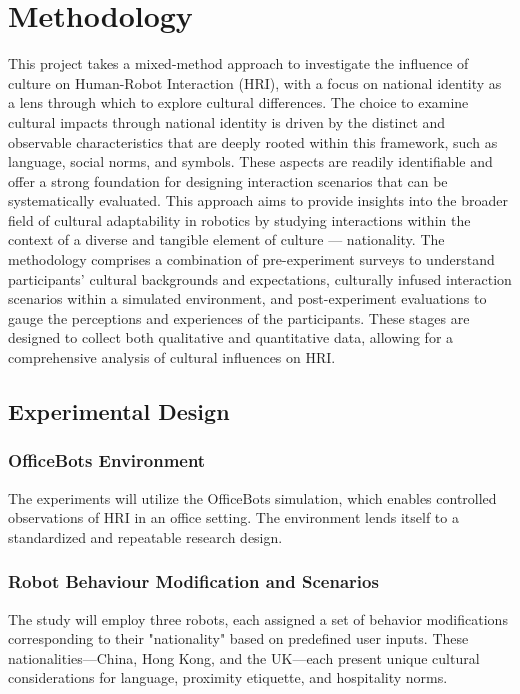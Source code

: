 \chapter{Methodology}

This project takes a mixed-method approach to investigate the influence of culture on Human-Robot Interaction (HRI), with a focus on national identity as a lens through which to explore cultural differences. The choice to examine cultural impacts through national identity is driven by the distinct and observable characteristics that are deeply rooted within this framework, such as language, social norms, and symbols. These aspects are readily identifiable and offer a strong foundation for designing interaction scenarios that can be systematically evaluated. This approach aims to provide insights into the broader field of cultural adaptability in robotics by studying interactions within the context of a diverse and tangible element of culture — nationality. The methodology comprises a combination of pre-experiment surveys to understand participants' cultural backgrounds and expectations, culturally infused interaction scenarios within a simulated environment, and post-experiment evaluations to gauge the perceptions and experiences of the participants. These stages are designed to collect both qualitative and quantitative data, allowing for a comprehensive analysis of cultural influences on HRI.

\section{Experimental Design}

\subsection{OfficeBots Environment}

The experiments will utilize the OfficeBots simulation, which enables controlled observations of HRI in an office setting. The environment lends itself to a standardized and repeatable research design.

\subsection{Robot Behaviour Modification and Scenarios}

The study will employ three robots, each assigned a set of behavior modifications corresponding to their "nationality" based on predefined user inputs. These nationalities—China, Hong Kong, and the UK—each present unique cultural considerations for language, proximity etiquette, and hospitality norms.

